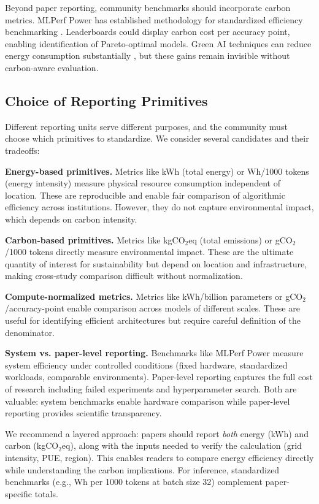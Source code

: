 \documentclass{article}
\theoremstyle{plain}
\theoremstyle{definition}
\theoremstyle{remark}
\begin{document}
Beyond paper reporting, community benchmarks should incorporate carbon metrics. MLPerf Power has established methodology for standardized efficiency benchmarking \cite{tschand2025mlperf}. Leaderboards could display carbon cost per accuracy point, enabling identification of Pareto-optimal models. Green AI techniques can reduce energy consumption substantially \cite{verdecchia2025green}, but these gains remain invisible without carbon-aware evaluation.

\subsection{Choice of Reporting Primitives}

Different reporting units serve different purposes, and the community must choose which primitives to standardize. We consider several candidates and their tradeoffs:

\textbf{Energy-based primitives.} Metrics like kWh (total energy) or Wh/1000 tokens (energy intensity) measure physical resource consumption independent of location. These are reproducible and enable fair comparison of algorithmic efficiency across institutions. However, they do not capture environmental impact, which depends on carbon intensity.

\textbf{Carbon-based primitives.} Metrics like kgCO$_2$eq (total emissions) or gCO$_2$/1000 tokens directly measure environmental impact. These are the ultimate quantity of interest for sustainability but depend on location and infrastructure, making cross-study comparison difficult without normalization.

\textbf{Compute-normalized metrics.} Metrics like kWh/billion parameters or gCO$_2$/accuracy-point enable comparison across models of different scales. These are useful for identifying efficient architectures but require careful definition of the denominator.

\textbf{System vs. paper-level reporting.} Benchmarks like MLPerf Power \cite{tschand2025mlperf} measure system efficiency under controlled conditions (fixed hardware, standardized workloads, comparable environments). Paper-level reporting captures the full cost of research including failed experiments and hyperparameter search. Both are valuable: system benchmarks enable hardware comparison while paper-level reporting provides scientific transparency.

We recommend a layered approach: papers should report \textit{both} energy (kWh) and carbon (kgCO$_2$eq), along with the inputs needed to verify the calculation (grid intensity, PUE, region). This enables readers to compare energy efficiency directly while understanding the carbon implications. For inference, standardized benchmarks (e.g., Wh per 1000 tokens at batch size 32) complement paper-specific totals.
\end{document}
